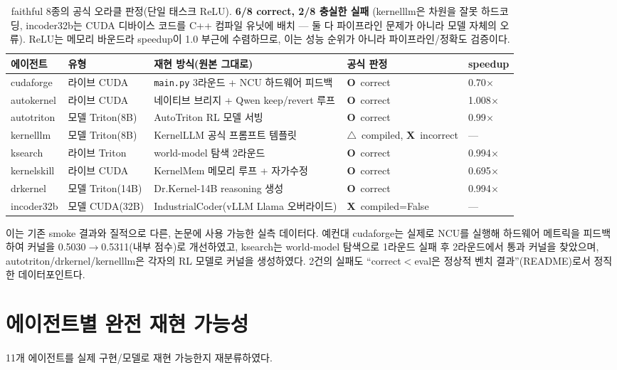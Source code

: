 \documentclass[11pt]{article}
\newcommand{\yes}{\textcolor{green!55!black}{\textbf{O}}}
\newcommand{\no}{\textcolor{red!70!black}{\textbf{X}}}
\newcommand{\warn}{\textcolor{orange!85!black}{\textbf{$\triangle$}}}
\newcommand{\code}[1]{\texttt{\small #1}}
\begin{document}
\begin{table}[h]
\centering
\begin{tabular}{@{}lllll@{}}
\toprule
\textbf{에이전트} & \textbf{유형} & \textbf{재현 방식(원본 그대로)} & \textbf{공식 판정} & \textbf{speedup} \\
\midrule
cudaforge   & 라이브 CUDA   & \code{main.py} 3라운드 + NCU 하드웨어 피드백 & \yes\ correct & 0.70$\times$ \\
autokernel  & 라이브 CUDA   & 네이티브 브리지 + Qwen keep/revert 루프    & \yes\ correct & 1.008$\times$ \\
autotriton  & 모델 Triton(8B) & AutoTriton RL 모델 서빙                 & \yes\ correct & 0.99$\times$ \\
kernelllm   & 모델 Triton(8B) & KernelLLM 공식 프롬프트 템플릿           & \warn\ compiled, \no\ incorrect & --- \\
ksearch     & 라이브 Triton & world-model 탐색 2라운드                 & \yes\ correct & 0.994$\times$ \\
kernelskill & 라이브 CUDA   & KernelMem 메모리 루프 + 자가수정          & \yes\ correct & 0.695$\times$ \\
drkernel    & 모델 Triton(14B) & Dr.Kernel-14B reasoning 생성           & \yes\ correct & 0.994$\times$ \\
incoder32b  & 모델 CUDA(32B) & IndustrialCoder(vLLM Llama 오버라이드)   & \no\ compiled=False & --- \\
\bottomrule
\end{tabular}
\caption{faithful 8종의 공식 오라클 판정(단일 태스크 ReLU). \textbf{6/8 correct, 2/8 충실한 실패}
(kernelllm은 차원을 잘못 하드코딩, incoder32b는 CUDA 디바이스 코드를 C++ 컴파일 유닛에 배치 --- 둘 다
파이프라인 문제가 아니라 모델 자체의 오류). ReLU는 메모리 바운드라 speedup이 1.0 부근에 수렴하므로,
이는 성능 순위가 아니라 파이프라인/정확도 검증이다.}
\end{table}

\noindent 이는 기존 smoke 결과와 질적으로 다른, 논문에 사용 가능한 실측 데이터다.
예컨대 cudaforge는 실제로 NCU를 실행해 하드웨어 메트릭을 피드백하여 커널을
0.5030$\to$0.5311(내부 점수)로 개선하였고, ksearch는 world-model 탐색으로 1라운드 실패 후
2라운드에서 통과 커널을 찾았으며, autotriton/drkernel/kernelllm은 각자의 RL 모델로 커널을 생성하였다.
2건의 실패도 ``correct$<$eval은 정상적 벤치 결과''(README)로서 정직한 데이터포인트다.

\section{에이전트별 완전 재현 가능성}
11개 에이전트를 실제 구현/모델로 재현 가능한지 재분류하였다.
\end{document}
